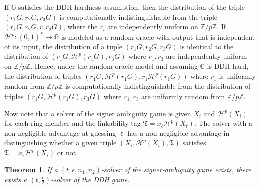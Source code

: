 \documentclass{mrl}
\theoremstyle{plain}
\newtheorem{theorem}{Theorem}[section]
\theoremstyle{definition}
\begin{document}
If $\mathbb{G}$ satisfies the DDH hardness assumption, then the distribution of the triple $(r_1G, r_2G, r_3G)$ is computationally indistinguishable from the triple $(r_1G, r_2G, r_1r_2G)$,  where the $r_i$ are independently uniform on $\mathbb{Z}/p\mathbb{Z}$. If $\mathcal{H}^p: \left\{0,1\right\}^* \to \mathbb{G}$ is modeled as a random oracle with output that is independent of its input, the distribution of a tuple $(r_1G, r_2G, r_3G)$ is identical to the distribution of $(r_1G, \mathcal{H}^p(r_1G), r_3G)$ where $r_1, r_3$ are independently uniform on $\mathbb{Z}/p\mathbb{Z}$. Hence, under the random oracle model and assuming $\mathbb{G}$ is DDH-hard, the distribution of triples $(r_1G, \mathcal{H}^p(r_1G), r_1\mathcal{H}^p(r_1G))$ where $r_1$ is uniformly random from $\mathbb{Z}/p\mathbb{Z}$ is computationally indistinguishable from the distribution of triples $(r_1G, \mathcal{H}^p(r_1G), r_3G)$ where $r_1, r_3$ are uniformly random from $\mathbb{Z}/p\mathbb{Z}$.
  
  

Now note that a solver of the signer ambiguity game is given $X_i$ and $\mathcal{H}^p(X_i)$ for each ring member and the linkability tag $\mathfrak{T} = x_\ell \mathcal{H}^p(X_\ell)$. The solver with a non-negligible advantage at guessing $\ell$ has a non-negligible advantage in distinguishing whether a given triple $(X_i, \mathcal{H}^p(X_i), \mathfrak{T})$ satisfies $\mathfrak{T} = x_i \mathcal{H}^p(X_i)$ or not.

\begin{theorem}
If a $(t, \epsilon, n_1, n_2)$-solver of the signer-ambiguity game exists, there exists a $(t, \frac{\epsilon}{2})$-solver of the DDH game. 
\end{theorem}
\end{document}
